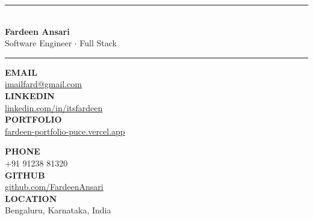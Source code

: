 \documentclass[10pt,a4paper]{article}
\begin{document}
\begin{tcolorbox}[
    enhanced,
    width=\textwidth,
    colback=white,
    colframe=HeaderLine,
    boxrule=0.5pt,
    arc=1.5mm,
    outer arc=1.5mm,
    left=10pt,
    right=10pt,
    top=5.5pt,
    bottom=5pt,
    boxsep=0pt,
    before skip=0pt,
    after skip=0pt
]
\noindent
\begin{minipage}[c]{0.355\textwidth}
    {\color{HeaderBlack}\rule{3.2cm}{2.2pt}}\\[5pt]
    {\fontsize{23}{26}\selectfont\bfseries\color{HeaderText} Fardeen Ansari}\\[2pt]
    {\fontsize{10.5}{13}\selectfont\color{HeaderGray} Software Engineer $\cdot$ Full Stack}
\end{minipage}
\hfill
\begin{minipage}[c]{0.4pt}
    \vspace{-1pt}
    \color{HeaderLine}\rule{0.4pt}{1.28cm}
\end{minipage}
\hfill
\begin{minipage}[c]{0.595\textwidth}
    \footnotesize
    \begin{minipage}[t]{0.48\linewidth}
        \raggedright
        {\fontsize{7}{8.5}\selectfont\bfseries\color{HeaderGray} EMAIL}\\[-1pt]
        {\fontsize{9}{11}\selectfont\color{HeaderText}\href{mailto:imailfard@gmail.com}{imailfard@gmail.com}}\\[2.5pt]
        {\fontsize{7}{8.5}\selectfont\bfseries\color{HeaderGray} LINKEDIN}\\[-1pt]
        {\fontsize{9}{11}\selectfont\color{HeaderText}\href{https://linkedin.com/in/itsfardeen}{linkedin.com/in/itsfardeen}}\\[2.5pt]
        {\fontsize{7}{8.5}\selectfont\bfseries\color{HeaderGray} PORTFOLIO}\\[-1pt]
        {\fontsize{9}{11}\selectfont\color{HeaderText}\href{https://fardeen-portfolio-puce.vercel.app}{fardeen-portfolio-puce.vercel.app}}
    \end{minipage}
    \hfill
    \begin{minipage}[t]{0.48\linewidth}
        \raggedright
        {\fontsize{7}{8.5}\selectfont\bfseries\color{HeaderGray} PHONE}\\[-1pt]
        {\fontsize{9}{11}\selectfont\color{HeaderText} +91 91238 81320}\\[2.5pt]
        {\fontsize{7}{8.5}\selectfont\bfseries\color{HeaderGray} GITHUB}\\[-1pt]
        {\fontsize{9}{11}\selectfont\color{HeaderText}\href{https://github.com/FardeenAnsari}{github.com/FardeenAnsari}}\\[2.5pt]
        {\fontsize{7}{8.5}\selectfont\bfseries\color{HeaderGray} LOCATION}\\[-1pt]
        {\fontsize{9}{11}\selectfont\color{HeaderText} Bengaluru, Karnataka, India}
    \end{minipage}
\end{minipage}
\end{tcolorbox}
\vspace{1.5pt}
\end{document}
